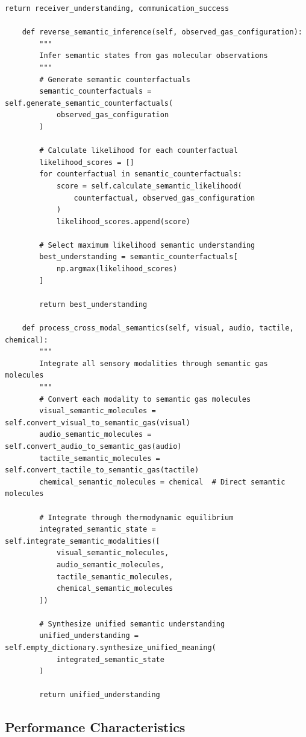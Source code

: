 \documentclass[11pt,a4paper]{article}
\begin{document}
\begin{lstlisting}[caption=Naked Semantic Engine Implementation]
        return receiver_understanding, communication_success
    
    def reverse_semantic_inference(self, observed_gas_configuration):
        """
        Infer semantic states from gas molecular observations
        """
        # Generate semantic counterfactuals
        semantic_counterfactuals = self.generate_semantic_counterfactuals(
            observed_gas_configuration
        )
        
        # Calculate likelihood for each counterfactual
        likelihood_scores = []
        for counterfactual in semantic_counterfactuals:
            score = self.calculate_semantic_likelihood(
                counterfactual, observed_gas_configuration
            )
            likelihood_scores.append(score)
        
        # Select maximum likelihood semantic understanding
        best_understanding = semantic_counterfactuals[
            np.argmax(likelihood_scores)
        ]
        
        return best_understanding
    
    def process_cross_modal_semantics(self, visual, audio, tactile, chemical):
        """
        Integrate all sensory modalities through semantic gas molecules
        """
        # Convert each modality to semantic gas molecules
        visual_semantic_molecules = self.convert_visual_to_semantic_gas(visual)
        audio_semantic_molecules = self.convert_audio_to_semantic_gas(audio)
        tactile_semantic_molecules = self.convert_tactile_to_semantic_gas(tactile)
        chemical_semantic_molecules = chemical  # Direct semantic molecules
        
        # Integrate through thermodynamic equilibrium
        integrated_semantic_state = self.integrate_semantic_modalities([
            visual_semantic_molecules,
            audio_semantic_molecules, 
            tactile_semantic_molecules,
            chemical_semantic_molecules
        ])
        
        # Synthesize unified semantic understanding
        unified_understanding = self.empty_dictionary.synthesize_unified_meaning(
            integrated_semantic_state
        )
        
        return unified_understanding
\end{lstlisting}

\subsection{Performance Characteristics}
\end{document}
